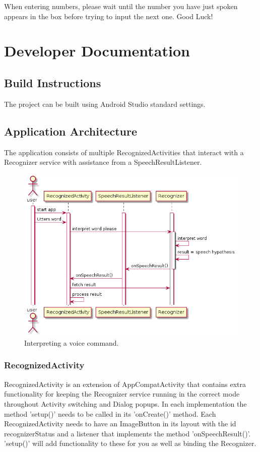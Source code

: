 \documentclass[11pt, oneside]{article}
\begin{document}
When entering numbers, please wait until the number you have just spoken appears
in the box before trying to input the next one.
Good Luck!

\pagebreak

\section{Developer Documentation}

\subsection{Build Instructions}
The project can be built using Android Studio standard settings.

\subsection{Application Architecture}
The application consists of multiple RecognizedActivities that
interact with a Recognizer service with assistance from a
SpeechResultListener.

\begin{figure}[!h]
	\includegraphics[width=0.7\columnwidth]{speechsequence}
	\caption{Interpreting a voice command.}
\end{figure}

\subsubsection{RecognizedActivity}
RecognizedActivity is an extension of AppCompatActivity that contains
extra functionality for keeping the Recognizer service running in the
correct mode throughout Activity switching and Dialog popups. In each implementation the method 'setup()' needs to be called in its 'onCreate()' method. Each RecognizedActivity needs to have an ImageButton in its layout with the id recognizerStatus and a listener that implements the method 'onSpeechResult()'. 'setup()' will add functionality to these for you as well as binding the Recognizer.
\end{document}
